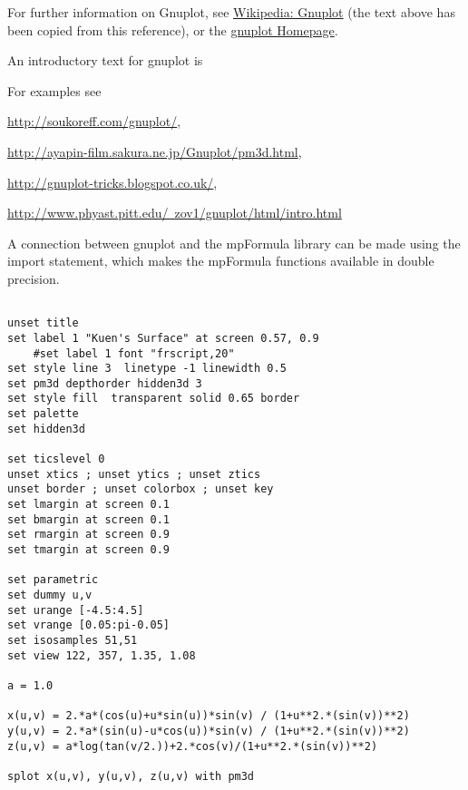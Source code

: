 \vpara
For further information on Gnuplot, see \href{http://en.wikipedia.org/wiki/Gnuplot}{Wikipedia: Gnuplot} (the text above has been copied from this reference), or the  \href{http://www.gnuplot.info/}{gnuplot Homepage}.

\vpara
An introductory text for gnuplot is \cite{Janert_2010}

\vpara
For examples see  

\href{http://soukoreff.com/gnuplot/}{http://soukoreff.com/gnuplot/}, 

\href{http://ayapin-film.sakura.ne.jp/Gnuplot/pm3d.html}{http://ayapin-film.sakura.ne.jp/Gnuplot/pm3d.html}, 

\href{http://gnuplot-tricks.blogspot.co.uk/}{http://gnuplot-tricks.blogspot.co.uk/}, 

\href{http://www.phyast.pitt.edu/~zov1/gnuplot/html/intro.html}{http://www.phyast.pitt.edu/~zov1/gnuplot/html/intro.html}


\vpara
A connection between gnuplot and the mpFormula library can be made using the import statement, which makes the mpFormula functions available in double precision.



\vpara

\begin{lstlisting}

unset title
set label 1 "Kuen's Surface" at screen 0.57, 0.9
    #set label 1 font "frscript,20"
set style line 3  linetype -1 linewidth 0.5
set pm3d depthorder hidden3d 3
set style fill  transparent solid 0.65 border
set palette
set hidden3d

set ticslevel 0
unset xtics ; unset ytics ; unset ztics
unset border ; unset colorbox ; unset key
set lmargin at screen 0.1
set bmargin at screen 0.1
set rmargin at screen 0.9
set tmargin at screen 0.9

set parametric
set dummy u,v
set urange [-4.5:4.5]
set vrange [0.05:pi-0.05]
set isosamples 51,51
set view 122, 357, 1.35, 1.08

a = 1.0

x(u,v) = 2.*a*(cos(u)+u*sin(u))*sin(v) / (1+u**2.*(sin(v))**2)
y(u,v) = 2.*a*(sin(u)-u*cos(u))*sin(v) / (1+u**2.*(sin(v))**2)
z(u,v) = a*log(tan(v/2.))+2.*cos(v)/(1+u**2.*(sin(v))**2)

splot x(u,v), y(u,v), z(u,v) with pm3d

\end{lstlisting}








